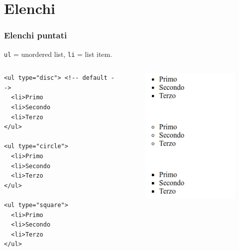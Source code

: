 \documentclass[]{beamer}
\begin{document}
\section{Elenchi}


\begin{frame}[fragile]
\frametitle{Elenchi puntati}
\texttt{ul} = unordered list, \texttt{li} = list item.
\begin{columns}
\begin{column}{0.45\textwidth}
\begin{scriptsize}
\begin{verbatim}
<ul type="disc"> <!-- default -->
  <li>Primo
  <li>Secondo
  <li>Terzo
</ul>

<ul type="circle">
  <li>Primo
  <li>Secondo
  <li>Terzo
</ul>

<ul type="square">
  <li>Primo
  <li>Secondo
  <li>Terzo
</ul>
\end{verbatim}
\end{scriptsize}
\end{column}
\begin{column}{0.45\textwidth}
\begin{figure}
\includegraphics[width=0.5\columnwidth]{screenshots/elencopuntato.png}
\end{figure}
\end{column}
\end{columns}
\end{frame}
\end{document}
